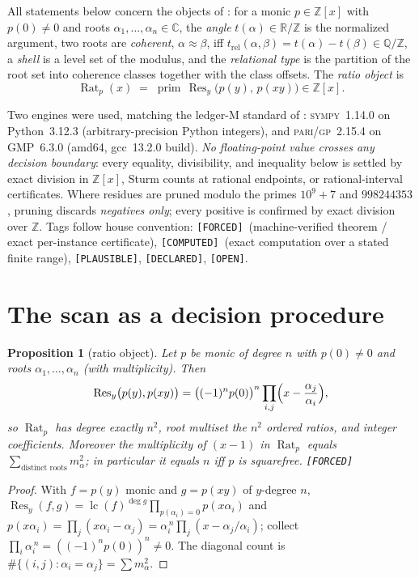 \documentclass[11pt]{article}
\newcommand{\F}{\textnormal{\texttt{[FORCED]}}}
\newcommand{\C}{\textnormal{\texttt{[COMPUTED]}}}
\newcommand{\Pl}{\textnormal{\texttt{[PLAUSIBLE]}}}
\newcommand{\Dc}{\textnormal{\texttt{[DECLARED]}}}
\newcommand{\Op}{\textnormal{\texttt{[OPEN]}}}
\newcommand{\Q}{\mathbb{Q}}
\newcommand{\Z}{\mathbb{Z}}
\newcommand{\R}{\mathbb{R}}
\newcommand{\Rat}{\operatorname{Rat}}
\newcommand{\Res}{\operatorname{Res}}
\newcommand{\lc}{\operatorname{lc}}
\newcommand{\gp}{\textsc{pari/gp}}
\newcommand{\sy}{\textsc{sympy}}
\newtheorem{proposition}[theorem]{Proposition}
\theoremstyle{definition}
\begin{document}
All statements below concern the objects of \cite{relcharge}: for a monic
$p\in\Z[x]$ with $p(0)\neq 0$ and roots $\alpha_1,\dots,\alpha_n\in\mathbb{C}$,
the \emph{angle} $t(\alpha)\in\R/\Z$ is the normalized argument, two roots are
\emph{coherent}, $\alpha\approx\beta$, iff
$t_{\mathrm{rel}}(\alpha,\beta)=t(\alpha)-t(\beta)\in\Q/\Z$, a \emph{shell} is a
level set of the modulus, and the \emph{relational type} is the partition of the
root set into coherence classes together with the class offsets. The
\emph{ratio object} is
\[
\Rat_p(x)\;=\;\operatorname{prim}\,\Res_y\bigl(p(y),\,p(xy)\bigr)\in\Z[x].
\]

Two engines were used, matching the ledger-M standard of \cite{relcharge}:
\sy~1.14.0 on Python~3.12.3 (arbitrary-precision Python integers), and
\gp~2.15.4 on GMP~6.3.0 (amd64, gcc~13.2.0 build). \emph{No floating-point value
crosses any decision boundary}: every equality, divisibility, and inequality
below is settled by exact division in $\Z[x]$, Sturm counts at rational
endpoints, or rational-interval certificates. Where residues are pruned modulo
the primes $10^9{+}7$ and $998244353$, pruning discards \emph{negatives only};
every positive is confirmed by exact division over $\Z$. Tags follow house
convention: \F\ (machine-verified theorem / exact per-instance certificate),
\C\ (exact computation over a stated finite range), \Pl, \Dc, \Op.

\section{The scan as a decision procedure}\label{sec:scan}

\begin{proposition}[ratio object]\label{prop:rat}
Let $p$ be monic of degree $n$ with $p(0)\neq0$ and roots $\alpha_1,\dots,\alpha_n$
(with multiplicity). Then
\[
\Res_y\bigl(p(y),p(xy)\bigr)
=\bigl((-1)^n p(0)\bigr)^{n}\prod_{i,j}\Bigl(x-\frac{\alpha_j}{\alpha_i}\Bigr),
\]
so $\Rat_p$ has degree exactly $n^2$, root multiset the $n^2$ ordered ratios,
and integer coefficients. Moreover the multiplicity of $(x-1)$ in $\Rat_p$
equals $\sum_{\text{distinct roots}}m_\alpha^{2}$; in particular it equals $n$
iff $p$ is squarefree. \F
\end{proposition}

\begin{proof}
With $f=p(y)$ monic and $g=p(xy)$ of $y$-degree $n$,
$\Res_y(f,g)=\lc(f)^{\deg g}\prod_{p(\alpha_i)=0}p(x\alpha_i)$ and
$p(x\alpha_i)=\prod_j(x\alpha_i-\alpha_j)=\alpha_i^{\,n}\prod_j(x-\alpha_j/\alpha_i)$;
collect $\prod_i\alpha_i^{\,n}=((-1)^np(0))^n\neq0$. The diagonal count is
$\#\{(i,j):\alpha_i=\alpha_j\}=\sum m_\alpha^2$.
\end{proof}
\end{document}
